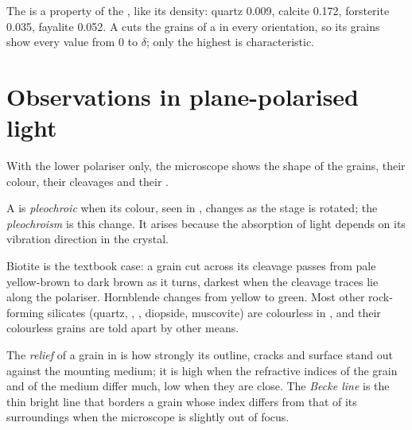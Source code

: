 The  is a property of the , like its density: quartz
\num{0.009}, calcite \num{0.172}, forsterite \num{0.035}, fayalite
\num{0.052}. A  cuts the grains of a  in every
orientation, so its grains show every value from 0 to $\delta$; only the
highest is characteristic.

\section{Observations in plane-polarised light}

With the lower polariser only, the microscope shows the shape of the grains,
their colour, their cleavages and their .

\begin{definition}[Pleochroism]\label{def:b1:optical-mineralogy:pleochroism}
A  is \emph{pleochroic} when its colour, seen in
, changes as the stage is rotated; the
\emph{pleochroism} is this change. It arises because the absorption of light
depends on its vibration direction in the crystal.
\end{definition}

Biotite is the textbook case: a grain cut across its cleavage passes from pale
yellow-brown to dark brown as it turns, darkest when the cleavage traces lie
along the polariser. Hornblende changes from yellow to green. Most other
rock-forming silicates (quartz, , , diopside, muscovite) are
colourless in , and their colourless grains are told apart by
other means.

\begin{definition}\label{def:b1:optical-mineralogy:relief}
The \emph{relief} of a grain in  is how
strongly its outline, cracks and surface stand out against the mounting
medium; it is high when the refractive indices of the grain and of the medium
differ much, low when they are close. The \emph{Becke line}
is the thin bright line that borders a grain whose index differs from that of
its surroundings when the microscope is slightly out of focus.
\end{definition}

